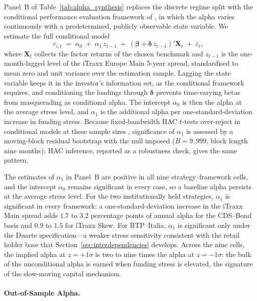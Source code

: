 Panel~B of Table~\ref{tab:alpha_synthesis} replaces the discrete
regime split with the conditional performance evaluation framework of
\citet{christopherson1998conditioning},
in which the alpha varies continuously with a predetermined,
publicly observable state variable. We estimate the full conditional
model
\begin{equation}\label{eq:cfg}
  r_{i,t} \;=\; \alpha_0 \;+\; \alpha_1\, z_{t-1}
  \;+\; \left(\boldsymbol{\beta} + \boldsymbol{\delta}\, z_{t-1}\right)'
  \mathbf{X}_{t} \;+\; \varepsilon_{t},
\end{equation}
where $\mathbf{X}_t$ collects the factor returns of the chosen
benchmark and $z_{t-1}$ is the one-month-lagged level of the iTraxx
Europe Main 5-year spread, standardised to mean zero and unit variance
over the estimation sample. Lagging the state variable keeps it in the
investor's information set, as the conditional framework requires, and
conditioning the loadings through $\boldsymbol{\delta}$ prevents
time-varying betas from masquerading as conditional alpha. The
intercept $\alpha_0$ is then the alpha at the average stress level,
and $\alpha_1$ is the additional alpha per one-standard-deviation
increase in funding stress. Because fixed-bandwidth HAC $t$-tests
over-reject in conditional models at these sample sizes
\citep{kiefer2005new, lazarus2018har}, significance of $\alpha_1$ is
assessed by a moving-block residual bootstrap with the null imposed
($B = 9{,}999$, block length nine months); HAC inference, reported as
a robustness check, gives the same pattern.

The estimates of $\alpha_1$ in Panel~B are positive in all nine
strategy--framework cells, and the intercept $\alpha_0$ remains
significant in every case, so a baseline alpha persists at the average
stress level. For the two institutionally held strategies, $\alpha_1$
is significant in every framework: a one-standard-deviation increase
in the iTraxx Main spread adds $1.7$ to $3.2$ percentage points of
annual alpha for the CDS--Bond basis and $0.9$ to $1.5$ for iTraxx
Skew. For BTP~Italia, $\alpha_1$ is significant only under the
Duarte specification---a weaker stress sensitivity consistent with the
retail holder base that Section~\ref{sec:interdependencies} develops.
Across the nine cells, the implied alpha at $z = +1\sigma$ is two to
nine times the alpha at $z = -1\sigma$: the bulk of the unconditional
alpha is earned when funding stress is elevated, the signature of the
slow-moving capital mechanism.

\paragraph{Out-of-Sample Alpha.}

